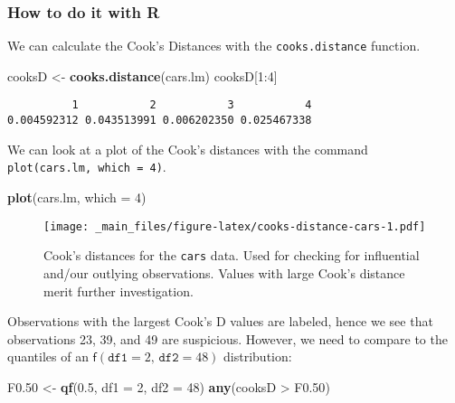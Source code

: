 \documentclass[]{book}
\newenvironment{Shaded}{\begin{snugshade}}{\end{snugshade}}
\newcommand{\KeywordTok}[1]{\textcolor[rgb]{0.13,0.29,0.53}{\textbf{{#1}}}}
\newcommand{\DataTypeTok}[1]{\textcolor[rgb]{0.13,0.29,0.53}{{#1}}}
\newcommand{\DecValTok}[1]{\textcolor[rgb]{0.00,0.00,0.81}{{#1}}}
\newcommand{\FloatTok}[1]{\textcolor[rgb]{0.00,0.00,0.81}{{#1}}}
\newcommand{\StringTok}[1]{\textcolor[rgb]{0.31,0.60,0.02}{{#1}}}
\newcommand{\NormalTok}[1]{{#1}}
\numberwithin{equation}{chapter}
\numberwithin{figure}{chapter}
\theoremstyle{plain}
\theoremstyle{definition}
\theoremstyle{remark}
\theoremstyle{definition}
\theoremstyle{definition}
\theoremstyle{remark}
\begin{document}
\subsubsection{How to do it with R}\label{how-to-do-it-with-r-33}

We can calculate the Cook's Distances with the \texttt{cooks.distance}
function.

\begin{Shaded}
\begin{Highlighting}[]
\NormalTok{cooksD <-}\StringTok{ }\KeywordTok{cooks.distance}\NormalTok{(cars.lm)}
\NormalTok{cooksD[}\DecValTok{1}\NormalTok{:}\DecValTok{4}\NormalTok{]}
\end{Highlighting}
\end{Shaded}

\begin{verbatim}
          1           2           3           4 
0.004592312 0.043513991 0.006202350 0.025467338 
\end{verbatim}

We can look at a plot of the Cook's distances with the command
\texttt{plot(cars.lm,\ which\ =\ 4)}.

\begin{Shaded}
\begin{Highlighting}[]
\KeywordTok{plot}\NormalTok{(cars.lm, }\DataTypeTok{which =} \DecValTok{4}\NormalTok{)}
\end{Highlighting}
\end{Shaded}

\begin{figure}[htbp]
\centering
\texttt{[image: \_main\_files/figure-latex/cooks-distance-cars-1.pdf]}
\caption{\label{fig:cooks-distance-cars}\small Cook's distances for the
\texttt{cars} data. Used for checking for influential and/our outlying
observations. Values with large Cook's distance merit further
investigation.}
\end{figure}






Observations with the largest Cook's D values are labeled, hence we see
that observations 23, 39, and 49 are suspicious. However, we need to
compare to the quantiles of an
\(\mathsf{f}(\mathtt{df1} = 2, \,\mathtt{df2} = 48)\) distribution:

\begin{Shaded}
\begin{Highlighting}[]
\NormalTok{F0}\FloatTok{.50} \NormalTok{<-}\StringTok{ }\KeywordTok{qf}\NormalTok{(}\FloatTok{0.5}\NormalTok{, }\DataTypeTok{df1 =} \DecValTok{2}\NormalTok{, }\DataTypeTok{df2 =} \DecValTok{48}\NormalTok{)}
\KeywordTok{any}\NormalTok{(cooksD >}\StringTok{ }\NormalTok{F0}\FloatTok{.50}\NormalTok{)}
\end{Highlighting}
\end{Shaded}
\end{document}
